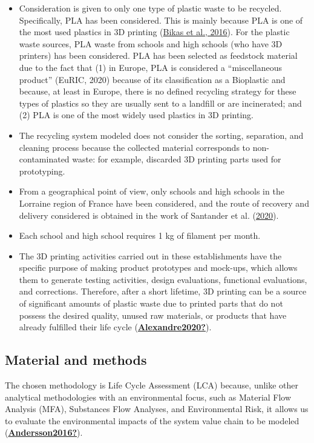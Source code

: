 \documentclass[]{elsarticle} %
\begin{document}
\begin{itemize}
\item
  Consideration is given to only one type of plastic waste to be recycled.
  Specifically, PLA has been considered.
  This is mainly because PLA is one of the most used plastics in 3D printing (\protect\hyperlink{ref-Bikas2016}{Bikas et al., 2016}).
  For the plastic waste sources, PLA waste from schools and high schools (who have 3D printers) has been considered.
  PLA has been selected as feedstock material due to the fact that (1) in Europe, PLA is considered a ``miscellaneous product'' (EuRIC, 2020) because of its classification as a Bioplastic and because, at least in Europe, there is no defined recycling strategy for these types of plastics so they are usually sent to a landfill or are incinerated;
  and (2) PLA is one of the most widely used plastics in 3D printing.
\item
  The recycling system modeled does not consider the sorting, separation, and cleaning process because the collected material corresponds to non-contaminated waste: for example, discarded 3D printing parts used for prototyping.
\item
  From a geographical point of view, only schools and high schools in the Lorraine region of France have been considered, and the route of recovery and delivery considered is obtained in the work of Santander et al. (\protect\hyperlink{ref-Santander2020}{2020}).
\item
  Each school and high school requires 1 kg of filament per month.
\item
  The 3D printing activities carried out in these establishments have the specific purpose of making product prototypes and mock-ups, which allows them to generate testing activities, design evaluations, functional evaluations, and corrections.
  Therefore, after a short lifetime, 3D printing can be a source of significant amounts of plastic waste due to printed parts that do not possess the desired quality, unused raw materials, or products that have already fulfilled their life cycle (\protect\hyperlink{ref-Alexandre2020}{\textbf{Alexandre2020?}}).
\end{itemize}

\hypertarget{material-and-methods}{%
\subsection{Material and methods}\label{material-and-methods}}

The chosen methodology is Life Cycle Assessment (LCA) because, unlike other analytical methodologies with an environmental focus, such as Material Flow Analysis (MFA), Substances Flow Analyses, and Environmental Risk, it allows us to evaluate the environmental impacts of the system value chain to be modeled (\protect\hyperlink{ref-Andersson2016}{\textbf{Andersson2016?}}).
\end{document}
